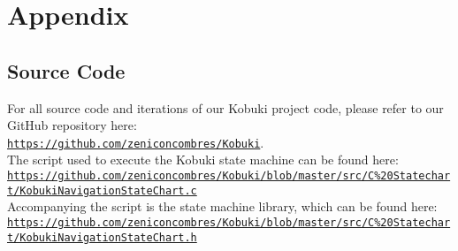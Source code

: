 \section{Appendix}
\subsection{Source Code}\label{app:code}
For all source code and iterations of our Kobuki project code, please refer to our GitHub repository here:\\ \texttt{\url{https://github.com/zeniconcombres/Kobuki}}.\\
The script used to execute the Kobuki state machine can be found here: 
\texttt{\url{https://github.com/zeniconcombres/Kobuki/blob/master/src/C\%20Statechart/KobukiNavigationStateChart.c}}\\
Accompanying the script is the state machine library, which can be found here:
\texttt{\url{https://github.com/zeniconcombres/Kobuki/blob/master/src/C\%20Statechart/KobukiNavigationStateChart.h}}
